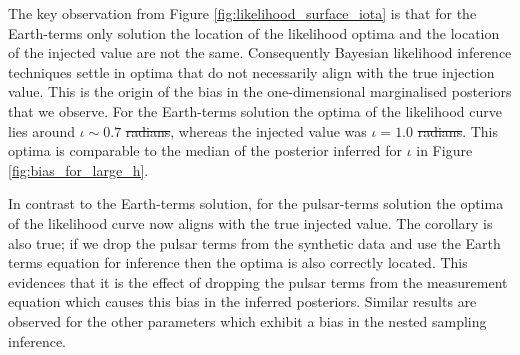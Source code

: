 \documentclass[fleqn,usenatbib,useAMS]{mnras}
\providecommand{\DIFadd}[1]{{\protect\color{blue}\uwave{#1}}} %
\providecommand{\DIFdel}[1]{{\protect\color{red}\sout{#1}}}                      %
\providecommand{\DIFaddbegin}{} %
\providecommand{\DIFaddend}{} %
\providecommand{\DIFdelbegin}{} %
\providecommand{\DIFdelend}{} %
\newcommand{\DIFscaledelfig}{0.5}
\newlength{\DIFdelgraphicswidth} %
\newlength{\DIFdelgraphicsheight} %
\newcommand{\DIFaddincludegraphics}[2][]{{\color{blue}\fbox{\DIFOincludegraphics[#1]{#2}}}} %
\newcommand{\DIFdelincludegraphics}[2][]{%
\sbox{\DIFdelgraphicsbox}{\DIFOincludegraphics[#1]{#2}}%
\settoboxwidth{\DIFdelgraphicswidth}{\DIFdelgraphicsbox} %
\settoboxtotalheight{\DIFdelgraphicsheight}{\DIFdelgraphicsbox} %
\scalebox{\DIFscaledelfig}{%
\parbox[b]{\DIFdelgraphicswidth}{\usebox{\DIFdelgraphicsbox}\\[-\baselineskip] \rule{\DIFdelgraphicswidth}{0em}}\llap{\resizebox{\DIFdelgraphicswidth}{\DIFdelgraphicsheight}{%
\setlength{\unitlength}{\DIFdelgraphicswidth}%
\begin{picture}(1,1)%
\thicklines\linethickness{2pt} %
{\color[rgb]{1,0,0}\put(0,0){\framebox(1,1){}}}%
{\color[rgb]{1,0,0}\put(0,0){\line( 1,1){1}}}%
{\color[rgb]{1,0,0}\put(0,1){\line(1,-1){1}}}%
\end{picture}%
}\hspace*{3pt}}} %
} %
\DeclareRobustCommand{\DIFaddbegin}{\DIFOaddbegin \let\includegraphics\DIFaddincludegraphics} %
\DeclareRobustCommand{\DIFaddend}{\DIFOaddend \let\includegraphics\DIFOincludegraphics} %
\DeclareRobustCommand{\DIFdelbegin}{\DIFOdelbegin \let\includegraphics\DIFdelincludegraphics} %
\DeclareRobustCommand{\DIFdelend}{\DIFOaddend \let\includegraphics\DIFOincludegraphics} %
\begin{document}
The key observation from Figure \ref{fig:likelihood_surface_iota} is that for the Earth-terms only solution the location of the likelihood optima and the location of the injected value are not the same. Consequently Bayesian likelihood inference techniques settle in optima that do not necessarily align with the true injection value. This is the origin of the bias in the one-dimensional marginalised posteriors that we observe.  For the Earth-terms solution the optima of the likelihood curve lies around $\iota \sim 0.7$ \DIFdelbegin \DIFdel{radians}\DIFdelend \DIFaddbegin \DIFadd{rad}\DIFaddend , whereas the injected value was $\iota = 1.0$ \DIFdelbegin \DIFdel{radians}\DIFdelend \DIFaddbegin \DIFadd{rad}\DIFaddend . This optima is comparable to the median of the posterior inferred for $\iota$ in Figure \ref{fig:bias_for_large_h}. \newline 

In contrast to the Earth-terms solution, for the pulsar-terms solution the optima of the likelihood curve now aligns with the true injected value. The corollary is also true; if we drop the pulsar terms from the synthetic data and use the Earth terms equation for inference then the optima is also correctly located. This evidences that it is the effect of dropping the pulsar terms from the measurement equation which causes this bias in the inferred posteriors. Similar results are observed for the other parameters which exhibit a bias in the nested sampling inference. \newline 
\end{document}
